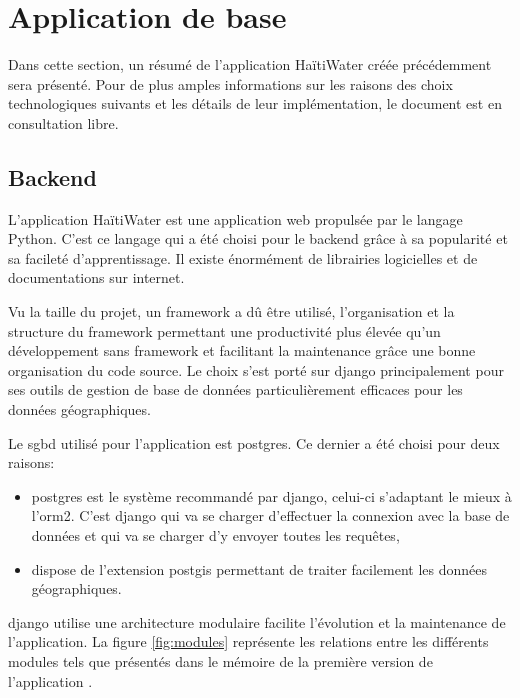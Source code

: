\documentclass{EPL-master-thesis-covers-FR}
\begin{document}
		\section{Application de base}
			Dans cette section, un résumé de l'application HaïtiWater créée précédemment sera présenté. Pour de plus amples informations sur les raisons des choix technologiques suivants et les détails de leur implémentation, le document \cite{ref:haitiwater} est en consultation libre.
			
			\subsection*{Backend}
				L'application HaïtiWater est une application web propulsée par le langage Python. C'est ce langage qui a été choisi pour le backend grâce à sa popularité et sa facileté d'apprentissage. Il existe énormément de librairies logicielles et de documentations sur internet.
				
				Vu la taille du projet, un \gls{framework} a dû être utilisé, l'organisation et la structure du framework permettant une productivité plus élevée qu'un développement sans \gls{framework} et facilitant la maintenance grâce une bonne organisation du code source. Le choix s'est porté sur \Gls{django} principalement pour ses outils de gestion de base de données particulièrement efficaces pour les données géographiques.	
			
				Le \gls{sgbd} utilisé pour l'application est \gls{postgres}. Ce dernier a été choisi pour deux raisons:
				\begin{itemize}
					\item \gls{postgres} est le système recommandé par \Gls{django}, celui-ci s'adaptant le mieux à l'\gls{orm2}. C'est \Gls{django} qui va se charger d'effectuer la connexion avec la base de données et qui va se charger d'y envoyer toutes les requêtes,
					\item dispose de l'extension \gls{postgis} permettant de traiter facilement les données géographiques.
				\end{itemize}			
				
				\Gls{django} utilise une architecture modulaire facilite l'évolution et la maintenance de l'application. La figure \ref{fig:modules} représente les relations entre les différents modules tels que présentés dans le mémoire de la première version de l'application \cite{ref:haitiwater}.
				
\end{document}
